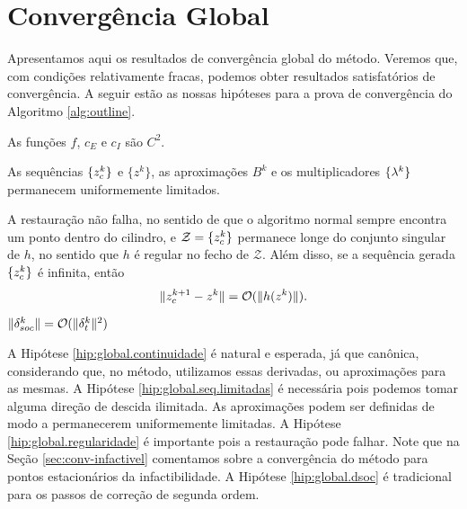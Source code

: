 \section{Converg\^encia Global}

Apresentamos aqui os resultados de convergência global do método. Veremos que,
com condições relativamente fracas, podemos obter resultados satisfatórios de
convergência. A seguir estão as nossas hipóteses para a prova de convergência do
Algoritmo \ref{alg:outline}.
\begin{hypoenv} 
  As funções $f$, $c_E$ e $c_I$ s\~ao
$C^2$.  
\end{hypoenv} 
\begin{hypoenv} 
  As sequ\^encias $\{z_c^{k}\}$ e $\{z^k\}$, as aproxima\c{c}\~oes $B^k$ e os
  multiplicadores $\{\lambda^{k}\}$ permanecem uniformemente limitados.
\end{hypoenv} 
\begin{hypoenv} A
  restaura\c{c}\~ao n\~ao falha, no sentido de que o algoritmo normal sempre
  encontra um ponto dentro do cilindro, e $\mathcal{Z} = \{z_c^{k}\}$ permanece
  longe do conjunto singular de $h$, no sentido que $h$ \'e regular no fecho de
  $\mathcal{Z}$.  Al\'em disso, se a sequ\^encia gerada $\{z_c^{k}\}$ \'e
  infinita, ent\~ao 
\begin{equation}\visiblelbl{nnormal} 
  \norma{\zc{k+1}-z^k} = \bigo(\norma{h(z^k)}).
\end{equation} 
\end{hypoenv}
\begin{hypoenv} 
  $\Vert \delta_{soc}^k\Vert = \mathcal{O}(\Vert \delta_t^k\Vert^2)$ 
\end{hypoenv} 
A Hipótese \ref{hip:global.continuidade} é natural e esperada, já que canônica,
considerando que, no método, utilizamos essas derivadas, ou aproximações para as
mesmas. 
A Hipótese \ref{hip:global.seq.limitadas} é necessária pois podemos tomar alguma
direção de descida ilimitada. 
As aproximações podem ser definidas de modo a permanecerem
uniformemente limitadas. 
A Hipótese \ref{hip:global.regularidade} é importante pois a restauração pode
falhar. Note que na Seção \ref{sec:conv-infactivel} comentamos sobre a
convergência do método para pontos estacionários da infactibilidade.
A Hipótese \ref{hip:global.dsoc} é tradicional para os passos de correção de
segunda ordem.

